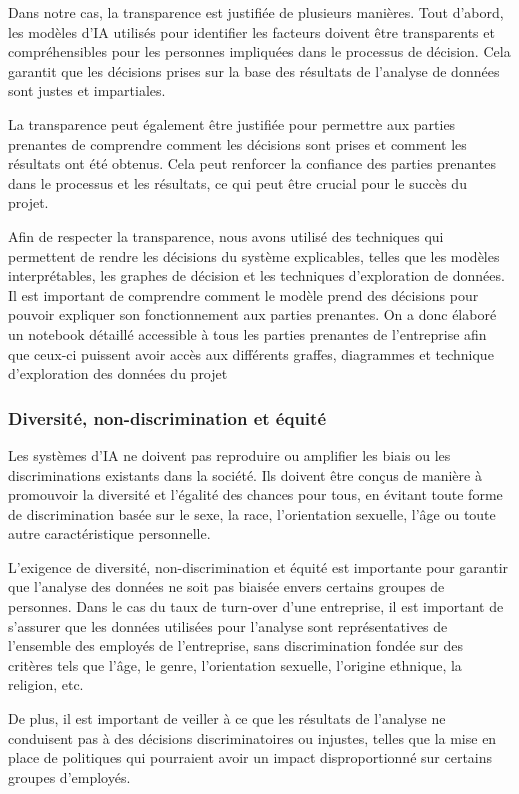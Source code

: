 Dans notre cas, la transparence est justifiée de plusieurs manières. Tout d'abord, les modèles d'IA utilisés pour identifier les facteurs doivent être transparents et compréhensibles pour les personnes impliquées dans le processus de décision. Cela garantit que les décisions prises sur la base des résultats de l'analyse de données sont justes et impartiales. 

La transparence peut également être justifiée pour permettre aux parties prenantes de comprendre comment les décisions sont prises et comment les résultats ont été obtenus. Cela peut renforcer la confiance des parties prenantes dans le processus et les résultats, ce qui peut être crucial pour le succès du projet. 

Afin de respecter la transparence, nous avons utilisé des techniques qui permettent de rendre les décisions du système explicables, telles que les modèles interprétables, les graphes de décision et les techniques d'exploration de données. Il est important de comprendre comment le modèle prend des décisions pour pouvoir expliquer son fonctionnement aux parties prenantes. On a donc élaboré un notebook détaillé accessible à tous les parties prenantes de l’entreprise afin que ceux-ci puissent avoir accès aux différents graffes, diagrammes et technique d’exploration des données du projet 


\subsubsection{Diversité, non-discrimination et équité}
Les systèmes d'IA ne doivent pas reproduire ou amplifier les biais ou les discriminations existants dans la société. Ils doivent être conçus de manière à promouvoir la diversité et l'égalité des chances pour tous, en évitant toute forme de discrimination basée sur le sexe, la race, l'orientation sexuelle, l'âge ou toute autre caractéristique personnelle. 

L'exigence de diversité, non-discrimination et équité est importante pour garantir que l'analyse des données ne soit pas biaisée envers certains groupes de personnes. Dans le cas du taux de turn-over d'une entreprise, il est important de s'assurer que les données utilisées pour l'analyse sont représentatives de l'ensemble des employés de l'entreprise, sans discrimination fondée sur des critères tels que l'âge, le genre, l'orientation sexuelle, l'origine ethnique, la religion, etc.  

De plus, il est important de veiller à ce que les résultats de l'analyse ne conduisent pas à des décisions discriminatoires ou injustes, telles que la mise en place de politiques qui pourraient avoir un impact disproportionné sur certains groupes d'employés.  

